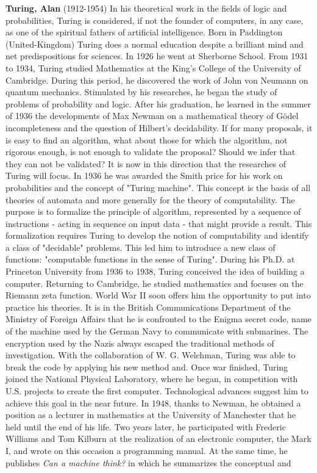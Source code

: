 \textbf{Turing, Alan} (1912-1954) In his theoretical work in the fields of logic and probabilities, Turing is considered, if not the founder of computers, in any case, as one of the spiritual fathers of artificial intelligence. Born in Paddington (United-Kingdom) Turing does a normal education despite a brilliant mind and net predispositions for sciences. In 1926 he went at Sherborne School. From 1931 to 1934, Turing studied Mathematics at the King's College of the University of Cambridge. During this period, he discovered the work of John von Neumann on quantum mechanics. Stimulated by his researches, he began the study of problems of probability and logic. After his graduation, he learned in the summer of 1936 the developments of Max Newman on a mathematical theory of Gödel incompleteness and the question of Hilbert's decidability. If for many proposals, it is easy to find an algorithm, what about those for which the algorithm, not rigorous enough, is not enough to validate the proposal? Should we infer that they can not be validated? It is now in this direction that the researches of Turing will focus. In 1936 he was awarded the Smith price for his work on probabilities and the concept of "Turing machine". This concept is the basis of all theories of automata and more generally for the theory of computability. The purpose is to formalize the principle of algorithm, represented by a sequence of instructions - acting in sequence on input data - that might provide a result. This formalization requires Turing to develop the notion of computability and identify a class of "decidable" problems. This led him to introduce a new class of functions: "computable functions in the sense of Turing". During his Ph.D. at Princeton University from 1936 to 1938, Turing conceived the idea of building a computer. Returning to Cambridge, he studied mathematics and focuses on the Riemann zeta function. World War II soon offers him the opportunity to put into practice his theories. It is in the British Communications Department of the Ministry of Foreign Affairs that he is confronted to the Enigma secret code, name of the machine used by the German Navy to communicate with submarines. The encryption used by the Nazis always escaped the traditional methods of investigation. With the collaboration of W. G. Welchman, Turing was able to break the code by applying his new method and. Once war finished, Turing joined the National Physical Laboratory, where he began, in competition with U.S. projects to create the first computer. Technological advances suggest him to achieve this goal in the near future. In 1948, thanks to Newman, he obtained a position as a lecturer in mathematics at the University of Manchester that he held until the end of his life. Two years later, he participated with Frederic Williams and Tom Kilburn at the realization of an electronic computer, the Mark I, and wrote on this occasion a programming manual. At the same time, he publishes \textit{Can a machine think?} in which he summarizes the conceptual and 